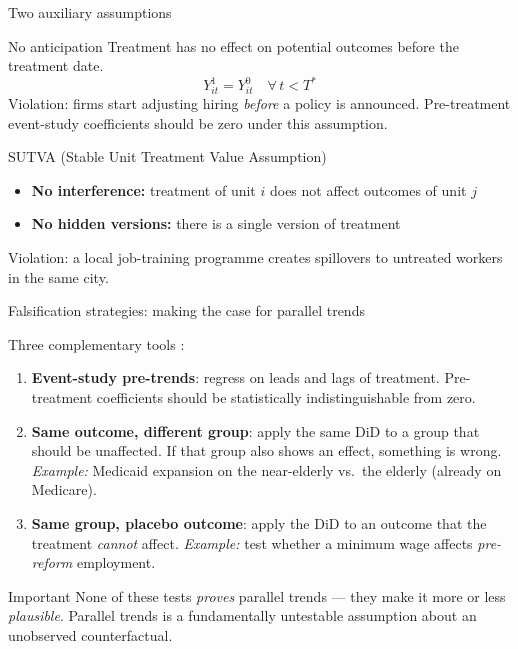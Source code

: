 \documentclass[aspectratio=169, 10pt]{beamer}
\begin{document}
\begin{frame}{Two auxiliary assumptions}

  \begin{block}{No anticipation}
    Treatment has no effect on potential outcomes before the treatment date.
    \[
      Y_{it}^1 = Y_{it}^0 \quad \forall\, t < T^*
    \]
    Violation: firms start adjusting hiring \emph{before} a policy is announced.
    Pre-treatment event-study coefficients should be zero under this assumption.
  \end{block}

  \bigskip

  \begin{block}{SUTVA (Stable Unit Treatment Value Assumption)}
    \begin{itemize}
      \item \textbf{No interference:} treatment of unit $i$ does not affect outcomes of unit $j$
      \item \textbf{No hidden versions:} there is a single version of treatment
    \end{itemize}
    Violation: a local job-training programme creates spillovers to untreated workers in the same city.
  \end{block}

\end{frame}

\begin{frame}{Falsification strategies: making the case for parallel trends}

  Three complementary tools \citep{cunningham2021}:

  \begin{enumerate}
    \item \textbf{Event-study pre-trends}: regress on leads and lags of treatment.
          Pre-treatment coefficients should be statistically indistinguishable from zero.

    \item \textbf{Same outcome, different group}: apply the same DiD to a group that
          should be unaffected. If that group also shows an effect, something is wrong.
          \emph{Example:} Medicaid expansion on the near-elderly vs.\ the elderly (already on Medicare).

    \item \textbf{Same group, placebo outcome}: apply the DiD to an outcome that the
          treatment \emph{cannot} affect.
          \emph{Example:} test whether a minimum wage affects \emph{pre-reform} employment.
  \end{enumerate}

  \begin{alertblock}{Important}
    None of these tests \emph{proves} parallel trends — they make it more or less \emph{plausible}.
    Parallel trends is a fundamentally untestable assumption about an unobserved counterfactual.
  \end{alertblock}

\end{frame}
\end{document}
